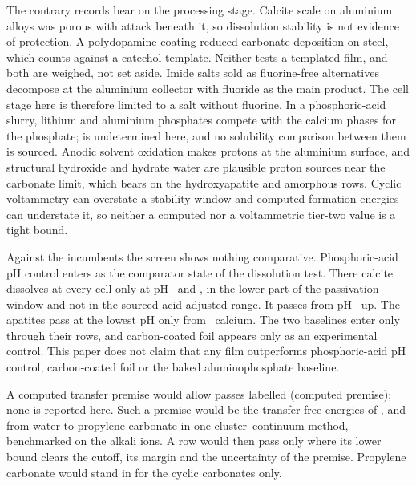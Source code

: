 The contrary records bear on the processing stage. %
Calcite scale on aluminium alloys was porous with attack beneath it\cite{osoriocelestino2020influence}, so dissolution stability is not evidence of protection. %
A polydopamine coating reduced carbonate deposition on steel\cite{yu2023study}, which counts against a catechol template. %
Neither tests a templated film, and both are weighed, not set aside. %
Imide salts sold as fluorine-free alternatives decompose at the aluminium collector with fluoride as the main product\cite{kramer2012mechanism}. %
The cell stage here is therefore limited to a salt without fluorine. %
In a phosphoric-acid slurry, lithium and aluminium phosphates compete with the calcium phases for the phosphate;  is undetermined here, and no solubility comparison between them is sourced. %
Anodic solvent oxidation makes protons at the aluminium surface\cite{ma2017revisiting}, and structural hydroxide and hydrate water are plausible proton sources near the carbonate limit, which bears on the hydroxyapatite and amorphous rows. %
Cyclic voltammetry can overstate a stability window and computed formation energies can understate it\cite{schwietert2021first,binninger2020comparison}, so neither a computed nor a voltammetric tier-two value is a tight bound. %

Against the incumbents the screen shows nothing comparative. %
Phosphoric-acid pH control enters as the comparator state of the dissolution test. %
There calcite dissolves at every cell only at pH \NumRegAcidExclLoCalcite\ and \NumRegAcidExclHiCalcite, in the lower part of the passivation window and not in the sourced acid-adjusted range. %
It passes from pH \NumRegAcidFirstCalcite\ up. %
The apatites pass at the lowest pH only from \NumRegAcidMinCaHap\ calcium. %
The two baselines enter only through their rows, and carbon-coated foil appears only as an experimental control. %
This paper does not claim that any film outperforms phosphoric-acid pH control, carbon-coated foil or the baked aluminophosphate baseline.

A computed transfer premise would allow passes labelled (computed premise); none is reported here. %
Such a premise would be the transfer free energies of ,  and  from water to propylene carbonate in one cluster--continuum method, benchmarked on the alkali ions. %
A row would then pass only where its lower bound clears the cutoff, its margin and the uncertainty of the premise. %
Propylene carbonate would stand in for the cyclic carbonates only. %

